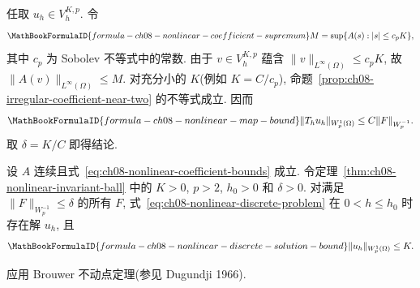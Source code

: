 \begin{Proof}
任取 $u_h\in V_h^{K,p}$. 令
\begin{equation}
\MathBookFormulaID{formula-ch08-nonlinear-coefficient-supremum}
\label{eq:ch08-nonlinear-coefficient-supremum}
M=\sup\{A(s):|s|\leq c_pK\},
\end{equation}
其中 $c_p$ 为 Sobolev 不等式中的常数. 由于 $v\in V_h^{K,p}$ 蕴含 $\|v\|_{L^\infty(\Omega)}\leq c_pK$, 故 $\|A(v)\|_{L^\infty(\Omega)}\leq M$. 对充分小的 $K$(例如 $K=C/c_p$), 命题~\ref{prop:ch08-irregular-coefficient-near-two} 的不等式成立. 因而
\[
\MathBookFormulaID{formula-ch08-nonlinear-map-bound}
\|T_hu_h\|_{W_p^1(\Omega)}
\leq C\|F\|_{W_p^{-1}}.
\]
取 $\delta=K/C$ 即得结论.
\end{Proof}

\begin{Corollary}
\label{cor:ch08-nonlinear-discrete-existence}
设 $A$ 连续且式~\eqref{eq:ch08-nonlinear-coefficient-bounds} 成立. 令定理~\ref{thm:ch08-nonlinear-invariant-ball} 中的 $K>0$, $p>2$, $h_0>0$ 和 $\delta>0$. 对满足 $\|F\|_{W_p^{-1}}\leq\delta$ 的所有 $F$, 式~\eqref{eq:ch08-nonlinear-discrete-problem} 在 $0<h\leq h_0$ 时存在解 $u_h$, 且
\[
\MathBookFormulaID{formula-ch08-nonlinear-discrete-solution-bound}
\|u_h\|_{W_p^1(\Omega)}\leq K.
\]
\end{Corollary}

\begin{Proof}
应用 Brouwer 不动点定理(参见 Dugundji 1966).
\end{Proof}

